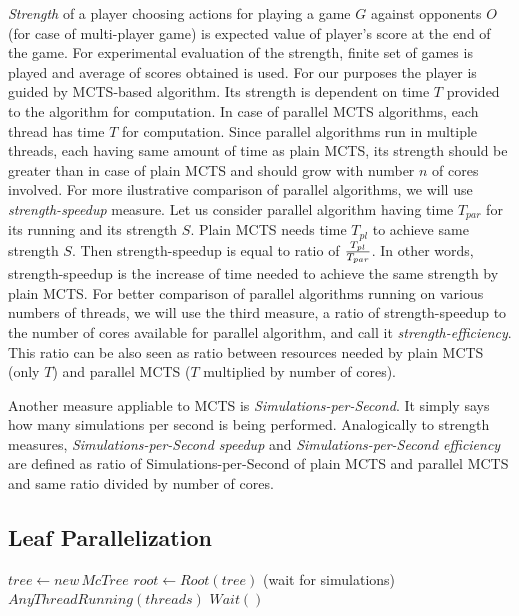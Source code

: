 \emph{Strength} of a player choosing actions for playing a game $G$ against
opponents $O$ (for case of multi-player game) 
is expected value of player's score at the end of the game. For experimental evaluation of the
strength, finite set of games is played and average
 of scores obtained is used. For our
purposes the player is guided by MCTS-based algorithm. Its strength is dependent on time $T$
provided to the algorithm for computation. In case of parallel MCTS algorithms, each thread has
time $T$ for computation. Since parallel algorithms run in multiple threads, each having same
amount of time as plain MCTS, its strength should be greater than in case of plain MCTS and should 
grow with number $n$ of cores involved. For more ilustrative comparison of parallel algorithms,
we will use \emph{strength-speedup} measure. Let us consider parallel algorithm having time
$T_{par}$
for its running and its strength $S$. Plain MCTS needs time $T_{pl}$ to achieve same strength
$S$. Then strength-speedup is equal to ratio of $T_{pl} \over T_{par}$. In other words,
strength-speedup is the increase of time needed to achieve the same strength by plain MCTS.
For better comparison of parallel algorithms running on various numbers of threads, we will use 
the third measure, a ratio of strength-speedup to the number of cores available for parallel
algorithm, and call it \emph{strength-efficiency}. This ratio can be also seen as ratio between
resources needed by plain MCTS (only $T$) and parallel MCTS ($T$ multiplied by number of
cores).

Another measure appliable to MCTS is \emph{Simulations-per-Second}. It simply says how many
simulations per second is being performed. Analogically to strength measures,
\emph{Simulations-per-Second speedup} and \emph{Simulations-per-Second efficiency} are defined
as ratio of Simulations-per-Second of plain MCTS and parallel MCTS and same ratio divided by
number of cores. 


\subsection{Leaf Parallelization}
\label{sec_leaf_parallelization}

\begin{algorithm}
\DontPrintSemicolon
\caption{$LeafParallelizationPlayouts(node)$}
\label{alg_leaf_parallelization}

$tree \leftarrow new\,McTree$ \;
$root \leftarrow Root(tree)$\;
\While(wait for simulations){$AnyThreadRunning(threads)$}{
    $Wait()$\;
}
\end{algorithm}


